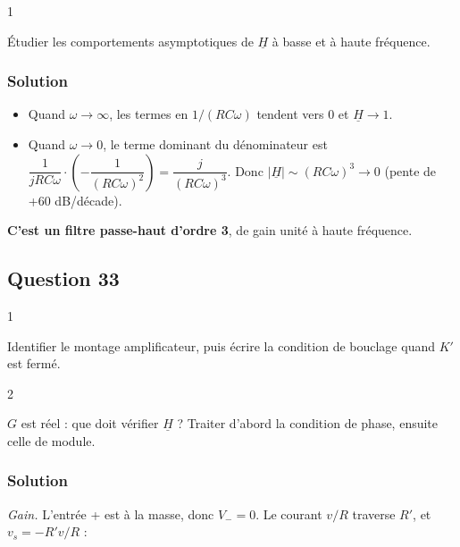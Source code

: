 \documentclass[11pt,a4paper]{article}
\providecommand{\tightlist}{\setlength{\itemsep}{0pt}\setlength{\parskip}{0pt}}
\begin{document}
\begin{indication}{1}

Étudier les comportements asymptotiques de \(\underline{H}\) à basse et à haute fréquence.

\end{indication}

\hypertarget{solution-31}{%
\subsubsection{Solution}\label{solution-31}}

\begin{itemize}
\tightlist
\item
  Quand \(\omega\to\infty\), les termes en \(1/(RC\omega)\) tendent vers 0 et \(\underline{H}\to1\).
\item
  Quand \(\omega\to0\), le terme dominant du dénominateur est \(\dfrac{1}{jRC\omega}\cdot\left(-\dfrac{1}{(RC\omega)^2}\right)=\dfrac{j}{(RC\omega)^3}\). Donc \(|\underline{H}|\sim(RC\omega)^3\to0\) (pente de +60 dB/décade).
\end{itemize}

\textbf{C'est un filtre passe-haut d'ordre 3}, de gain unité à haute fréquence.

\hypertarget{question-33}{%
\subsection{Question 33}\label{question-33}}

\begin{indication}{1}

Identifier le montage amplificateur, puis écrire la condition de bouclage quand \(K'\) est fermé.

\end{indication}

\begin{indication}{2}

\(G\) est réel : que doit vérifier \(\underline{H}\) ? Traiter d'abord la condition de phase, ensuite celle de module.

\end{indication}

\hypertarget{solution-32}{%
\subsubsection{Solution}\label{solution-32}}

\emph{Gain.} L'entrée + est à la masse, donc \(V_-=0\). Le courant \(v/R\) traverse \(R'\), et \(v_s=-R'v/R\) :
\end{document}
